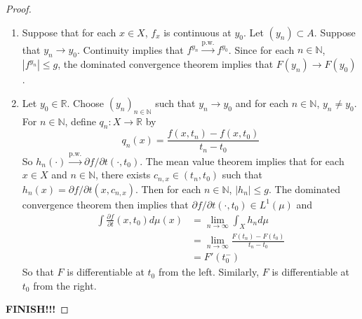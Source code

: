 \documentclass[12pt]{amsart}
\theoremstyle{definition}
\newcommand{\N}{\mathbb{N}}
\newcommand{\R}{\mathbb{R}}
\newcommand{\p}{\partial}
\newcommand{\limn}{\lim \limits_{n \rightarrow \infty}}
\newcommand{\convt}[1]{\xrightarrow{\text{#1}}}
\begin{document}
	\begin{proof}\
	\begin{enumerate}
	\item Suppose that for each $x \in X$, $f_x$ is continuous at $y_0$. Let $(y_n) \subset A$. Suppose that $y_n \rightarrow y_0$. Continuity implies that $f^{y_n} \convt{p.w.} f^{y_0}$. Since for each $n \in \N$, $|f^{y_n}| \leq g$, the dominated convergence theorem implies that $F(y_n) \rightarrow F(y_0)$.
	\item Let $y_0 \in \R$. Choose $(y_n)_{n \in \N}$ such that $ y_n \rightarrow y_0$ and for each $n \in \N$, $y_n \neq y_0$. For $n \in \N$, define $q_n:X \rightarrow \R$ by 
	$$q_n(x) = \frac{f(x,t_n) - f(x, t_0)}{t_n - t_0}$$ So $h_n(\cdot) \convt{p.w.} \p f / \p t (\cdot, t_0)$. The mean value theorem implies that for each $x \in X$ and $n \in \N$, there exists $c_{n,x} \in (t_n,t_0)$ such that $h_n(x) = \p f / \p t (x, c_{n,x})$. Then for each $n \in \N$, $|h_n| \leq g$. The dominated convergence theorem then implies that $\p f / \p t (\cdot, t_0) \in L^1(\mu)$ and 
	\begin{align*}
	\int \frac{\p f }{\p t} (x, t_0) d\mu(x) 
	&=  \limn \int_X h_n d\mu  \\
	&= \limn \frac{F(t_n) - F(t_0)}{t_n - t_0} \\
	&= F'(t_0^-) 	
	\end{align*}
	So that $F$ is differentiable at $t_0$ from the left. Similarly, $F$ is differentiable at $t_0$ from the right. 
	\end{enumerate}
	\textbf{FINISH!!!}
	\end{proof}





















	




















	
	
\end{document}
